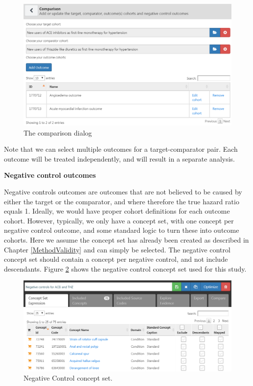 \documentclass[11pt]{book}
\theoremstyle{definition}
\theoremstyle{definition}
\theoremstyle{definition}
\theoremstyle{remark}
\begin{document}
\begin{figure}

{\centering \includegraphics[width=1\linewidth]{images/PopulationLevelEstimation/comparisons} 

}

\caption{The comparison dialog}\label{fig:comparisons}
\end{figure}

Note that we can select multiple outcomes for a target-comparator pair. Each outcome will be treated independently, and will result in a separate analysis.

\textbf{Negative control outcomes}

Negative controls outcomes are outcomes that are not believed to be caused by either the target or the comparator, and where therefore the true hazard ratio equals 1. Ideally, we would have proper cohort definitions for each outcome cohort. However, typically, we only have a concept set, with one concept per negative control outcome, and some standard logic to turn these into outcome cohorts. Here we assume the concept set has already been created as described in Chapter \ref{MethodValidity} and can simply be selected. The negative control concept set should contain a concept per negative control, and not include descendants. Figure \ref{fig:ncConceptSet} shows the negative control concept set used for this study.

\begin{figure}

{\centering \includegraphics[width=1\linewidth]{images/PopulationLevelEstimation/ncConceptSet} 

}

\caption{Negative Control concept set.}\label{fig:ncConceptSet}
\end{figure}
\end{document}

